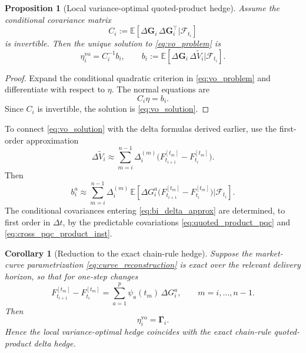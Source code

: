 \documentclass[10pt,a4paper,reqno]{amsart}
\newcommand{\<}{\langle}
\renewcommand{\>}{\rangle}
\newtheorem{corollary}[theorem]{Corollary}
\newtheorem{proposition}[theorem]{Proposition}
\theoremstyle{example}
\begin{document}
\begin{proposition}[Local variance-optimal quoted-product hedge]
\label{prop:vo_quoted}
Assume the conditional covariance matrix
\[
C_i
:=
\mathbb{E}\!\left[
\Delta \mathbf{G}_i\,\Delta \mathbf{G}_i^\top
\Big|
\mathcal{F}_{t_i}
\right]
\]
is invertible. Then the unique solution to \eqref{eq:vo_problem} is
\begin{equation}
\label{eq:vo_solution}
\eta_i^{\mathrm{vo}}
=
C_i^{-1} b_i,
\qquad
b_i
:=
\mathbb{E}\!\left[
\Delta \mathbf{G}_i\,\Delta \widetilde V_i
\Big|
\mathcal{F}_{t_i}
\right].
\end{equation}
\end{proposition}

\begin{proof}
Expand the conditional quadratic criterion in \eqref{eq:vo_problem} and differentiate with respect to
$\eta$. The normal equations are
\[
C_i \eta = b_i.
\]
Since $C_i$ is invertible, the solution is \eqref{eq:vo_solution}.
\end{proof}

To connect \eqref{eq:vo_solution} with the delta formulas derived earlier, use the first-order
approximation
\begin{equation}
\label{eq:delta_linearization_value}
\Delta \widetilde V_i
\approx
\sum_{m=i}^{n-1}
\Delta_i^{(m)}
\Big(
F_{t_{i+1}}^{[t_m]}-F_{t_i}^{[t_m]}
\Big).
\end{equation}
Then
\begin{equation}
\label{eq:bi_delta_approx}
b_i^a
\approx
\sum_{m=i}^{n-1}
\Delta_i^{(m)}
\,
\mathbb{E}\!\left[
\Delta G_i^a
\Big(
F_{t_{i+1}}^{[t_m]}-F_{t_i}^{[t_m]}
\Big)
\Big|
\mathcal{F}_{t_i}
\right].
\end{equation}
The conditional covariances entering \eqref{eq:bi_delta_approx} are determined, to first order in
$\Delta t$, by the predictable covariations
\eqref{eq:quoted_product_pqc} and \eqref{eq:cross_pqc_product_inst}.

\begin{corollary}[Reduction to the exact chain-rule hedge]
\label{cor:vo_equals_chain_rule}
Suppose the market-curve parametrization \eqref{eq:curve_reconstruction} is exact over the relevant
delivery horizon, so that for one-step changes
\[
F_{t_{i+1}}^{[t_m]}-F_{t_i}^{[t_m]}
=
\sum_{a=1}^p
\psi_a(t_m)\,
\Delta G_i^a,
\qquad m=i,\dots,n-1.
\]
Then
\[
\eta_i^{\mathrm{vo}}=\boldsymbol{\Gamma}_i.
\]
Hence the local variance-optimal hedge coincides with the exact chain-rule quoted-product delta hedge.
\end{corollary}
\end{document}
